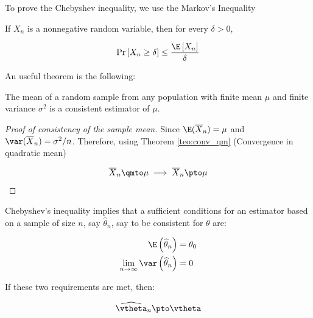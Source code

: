 \documentclass[english,12pt]{book}\usepackage[]{graphicx}\usepackage[]{xcolor}
\begin{document}
To prove the Chebyshev inequality, we use the Markov's Inequality

\begin{definition}\label{definition:chebyshev_ineq}
	 If $X_n$ is a nonnegative random variable, then for every $\delta > 0$,
	 
	 \begin{equation*}
	 \Pr\left[X_n \geq \delta \right]\leq \frac{\E\left[X_n\right]}{\delta}
	 \end{equation*}
\end{definition}


An useful theorem is the following:

\begin{theorem}\label{teo:consistency_sample_mean}
The mean of a random sample from any population with finite mean $\mu$ and finite variance $\sigma^2$ is a consistent estimator of $\mu$.
\end{theorem}

\begin{proof}[Proof of consistency of the sample mean]
Since $\E(\overline{X}_n) = \mu$ and $\var(\overline{X}_n) = \sigma^2/n$. Therefore, using Theorem \ref{teo:conv_qm} (Convergence in quadratic mean)

\begin{equation*}
\overline{X}_n \qmto \mu \implies \overline{X}_n \pto \mu
\end{equation*}
\end{proof}

\begin{theorem}\label{teo:chebyshev}
Chebyshev's inequality implies that a sufficient conditions for an estimator based on a sample of size $n$, say $\widehat{\theta}_n$, say to be consistent for $\theta$ are:

\begin{equation*}
  \begin{aligned}
    \E\left(\widehat{\theta}_n\right) & = \theta_0 \\
    \lim_{n \to \infty} \var\left(\widehat{\theta}_n\right)& = 0
  \end{aligned}
\end{equation*}

If these two requirements are met, then:

\begin{equation*}
\widehat{\vtheta}_n\pto \vtheta
\end{equation*}
\end{theorem}
\end{document}
